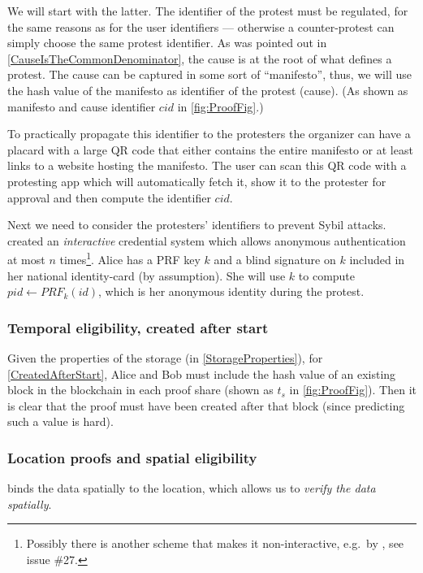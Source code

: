 We will start with the latter.
The identifier of the protest must be regulated, for the same reasons as for the 
user identifiers --- otherwise a counter-protest can simply choose the same 
protest identifier.
As was pointed out in \cref{CauseIsTheCommonDenominator}, the cause is at the 
root of what defines a protest.
The cause can be captured in some sort of \enquote{manifesto}, thus, we will use 
the hash value of the manifesto as identifier of the protest (cause).
(As shown as manifesto and cause identifier \(cid\) in \cref{fig:ProofFig}.)

To practically propagate this identifier to the protesters the organizer can 
have a placard with a large QR code that either contains the entire manifesto or 
at least links to a website hosting the manifesto.
The user can scan this QR code with a protesting app which will automatically 
fetch it, show it to the protester for approval and then compute the identifier 
\(cid\).

Next we need to consider the protesters' identifiers to prevent Sybil attacks.
\Textcite{HowToWinTheCloneWars} created an \emph{interactive} credential system 
which allows anonymous authentication at most \(n\) times\footnote{%
  Possibly there is another scheme that makes it non-interactive, e.g.\ by 
  \Textcite{Psignatures}, see issue \#27.
}.
Alice has a \ac{PRF} key \(k\) and a blind signature on \(k\) included in her 
national identity-card (by assumption).
She will use \(k\) to compute \(pid\gets PRF_k(id)\), which is her anonymous 
identity during the protest.

\subsubsection{Temporal eligibility, created after start}

Given the properties of the storage (in \cref{StorageProperties}), for 
\cref{CreatedAfterStart}, Alice and Bob must include the hash value of an 
existing block in the blockchain in each proof share (shown as \(t_s\) in 
\cref{fig:ProofFig}).
Then it is clear that the proof must have been created after that block (since 
predicting such a value is hard).

\subsubsection{Location proofs and spatial eligibility}

 binds the data spatially to the location, which allows 
us to \emph{verify the data spatially}.

